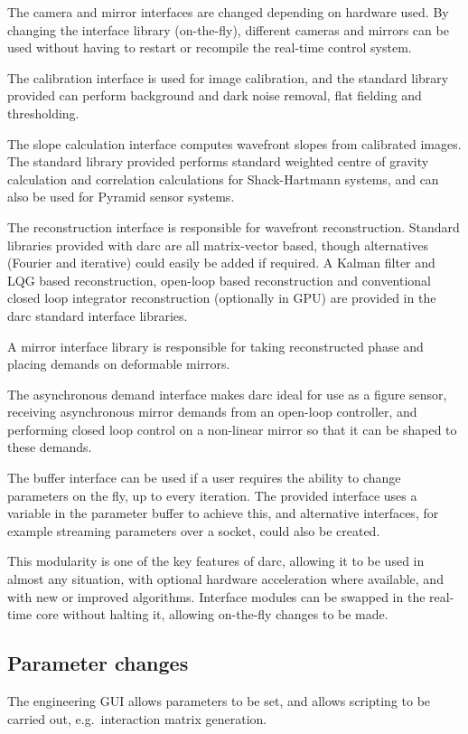 \documentclass[a4,10pt]{article}
\begin{document}
The camera and mirror interfaces are changed depending on hardware
used.  By changing the interface library (on-the-fly), different
cameras and mirrors can be used without having to restart or recompile
the real-time control system.

The calibration interface is used for image calibration, and the
standard library provided can perform background and dark noise
removal, flat fielding and thresholding.

The slope calculation interface computes wavefront slopes from
calibrated images.  The standard library provided performs standard
weighted centre of gravity calculation and correlation calculations
for Shack-Hartmann systems, and can also be used for Pyramid sensor
systems.

The reconstruction interface is responsible for wavefront
reconstruction.  Standard libraries provided with darc are all
matrix-vector based, though alternatives (Fourier and iterative) could
easily be added if required.  A Kalman filter and LQG based reconstruction,
open-loop based reconstruction and conventional closed loop integrator
reconstruction (optionally in GPU) are provided in the darc standard
interface libraries.

A mirror interface library is responsible for taking reconstructed
phase and placing demands on deformable mirrors.  

The asynchronous demand interface makes darc ideal for use as a figure
sensor, receiving asynchronous mirror demands from an open-loop
controller, and performing closed loop control on a non-linear mirror
so that it can be shaped to these demands.

The buffer interface can be used if a user requires the ability to
change parameters on the fly, up to every iteration.  The provided
interface uses a variable in the parameter buffer to achieve this, and
alternative interfaces, for example streaming parameters over a
socket, could also be created.

This modularity is one of the key features of darc, allowing it to be
used in almost any situation, with optional hardware acceleration
where available, and with new or improved algorithms.  Interface
modules can be swapped in the real-time core without halting it,
allowing on-the-fly changes to be made.



\subsection{Parameter changes}
The engineering GUI allows parameters to be set, and allows scripting
to be carried out, e.g.\ interaction matrix generation.
\end{document}
